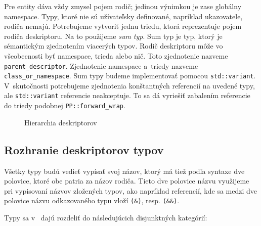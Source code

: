 Pre entity dáva vždy zmysel pojem rodič; jedinou výnimkou je zase globálny namespace. Typy, ktoré nie sú užívateľsky definované, napríklad ukazovatele, rodiča nemajú. Potrebujeme vytvoriť jednu triedu, ktorá reprezentuje pojem rodiča deskriptoru. Na to použijeme \emph{sum typ}. Sum typ je typ, ktorý je sémantickým zjednotením viacerých typov. Rodič deskriptoru môže vo všeobecnosti byť namespace, trieda alebo nič. Toto zjednotenie nazveme \texttt{parent\_descriptor}. Zjednotenie name\-space a~triedy nazveme \texttt{class\_or\_namespace}. Sum typy budeme implementovať pomocou \texttt{std::variant}. V~skutočnosti potrebujeme zjednotenia konštantných referencií na uvedené typy, ale \texttt{std::variant} referencie neakceptuje. To sa dá vyriešiť zabalením referencie do triedy podobnej \texttt{PP::forward\_wrap}.
\begin{figure}[H]
\begin{center}
\caption{Hierarchia deskriptorov}
\end{center}
\end{figure}

\subsection{Rozhranie deskriptorov typov}

Všetky typy budú vedieť vypísať svoj názov, ktorý má tiež podľa syntaxe dve polovice, ktoré obe patria za názov rodiča. Tieto dve polovice názvu využijeme pri vypisovaní názvov zložených typov, ako napríklad referencií, kde sa medzi dve polovice názvu odkazovaného typu vloží \texttt{(\&)}, resp. \texttt{(\&\&)}.

Typy sa v~\Cpp{} dajú rozdeliť do následujúcich disjunktných kategórií:

